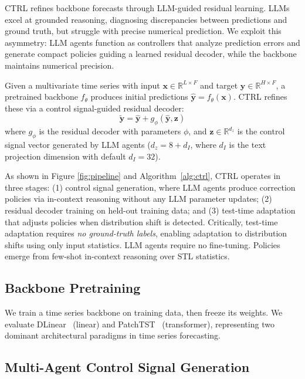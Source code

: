 CTRL refines backbone forecasts through LLM-guided residual learning. LLMs excel at grounded reasoning, diagnosing discrepancies between predictions and ground truth, but struggle with precise numerical prediction. We exploit this asymmetry: LLM agents function as controllers that analyze prediction errors and generate compact policies guiding a learned residual decoder, while the backbone maintains numerical precision.

Given a multivariate time series with input $\mathbf{x} \in \mathbb{R}^{L \times F}$ and target $\mathbf{y} \in \mathbb{R}^{H \times F}$, a pretrained backbone $f_\theta$ produces initial predictions $\hat{\mathbf{y}} = f_\theta(\mathbf{x})$. CTRL refines these via a control signal-guided residual decoder:
\begin{equation}
    \tilde{\mathbf{y}} = \hat{\mathbf{y}} + g_\phi(\hat{\mathbf{y}}, \mathbf{z})
\end{equation}
where $g_\phi$ is the residual decoder with parameters $\phi$, and $\mathbf{z} \in \mathbb{R}^{d_z}$ is the control signal vector generated by LLM agents ($d_z = 8 + d_I$, where $d_I$ is the text projection dimension with default $d_I = 32$).

As shown in Figure \ref{fig:pipeline} and Algorithm~\ref{alg:ctrl}, CTRL operates in three stages: (1) control signal generation, where LLM agents produce correction policies via in-context reasoning without any LLM parameter updates; (2) residual decoder training on held-out training data; and (3) test-time adaptation that adjusts policies when distribution shift is detected.
Critically, test-time adaptation requires \emph{no ground-truth labels}, enabling adaptation to distribution shifts using only input statistics. LLM agents require no fine-tuning. Policies emerge from few-shot in-context reasoning over STL statistics. %
\subsection{Backbone Pretraining}

We train a time series backbone on training data, then freeze its weights. We evaluate DLinear~\citep{Zeng2023DLinear} (linear) and PatchTST~\citep{Nie2023PatchTST} (transformer), representing two dominant architectural paradigms in time series forecasting.
\subsection{Multi-Agent Control Signal Generation}

